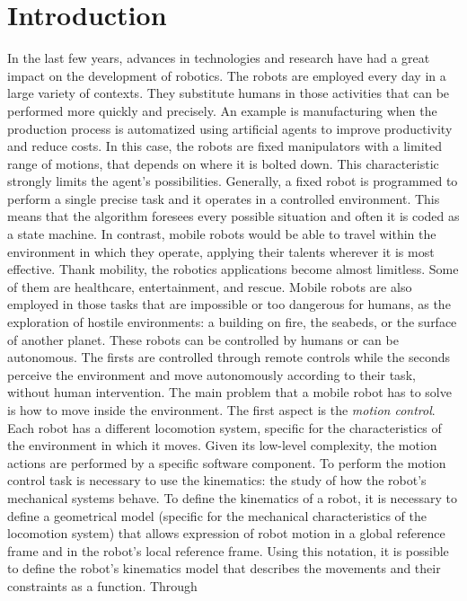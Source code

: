 \section{Introduction}\label{header-n3}

In the last few years, advances in technologies and research have had a
great impact on the development of robotics. The robots are employed
every day in a large variety of contexts. They substitute humans in
those activities that can be performed more quickly and precisely. An
example is manufacturing when the production process is automatized
using artificial agents to improve productivity and reduce costs. In
this case, the robots are fixed manipulators with a limited range of
motions, that depends on where it is bolted down. This characteristic
strongly limits the agent's possibilities. Generally, a fixed robot is
programmed to perform a single precise task and it operates in a
controlled environment. This means that the algorithm foresees every
possible situation and often it is coded as a state machine. In
contrast, mobile robots would be able to travel within the environment
in which they operate, applying their talents wherever it is most
effective. Thank mobility, the robotics applications become almost
limitless. Some of them are healthcare, entertainment, and rescue.
Mobile robots are also employed in those tasks that are impossible or
too dangerous for humans, as the exploration of hostile environments: a
building on fire, the seabeds, or the surface of another planet. These
robots can be controlled by humans or can be autonomous. The firsts are
controlled through remote controls while the seconds perceive the
environment and move autonomously according to their task, without human
intervention. The main problem that a mobile robot has to solve is how
to move inside the environment. The first aspect is the \emph{motion
	control}. Each robot has a different locomotion system, specific for the
characteristics of the environment in which it moves. Given its
low-level complexity, the motion actions are performed by a specific
software component. To perform the motion control task is necessary to
use the kinematics: the study of how the robot's mechanical systems
behave. To define the kinematics of a robot, it is necessary to define a
geometrical model (specific for the mechanical characteristics of the
locomotion system) that allows expression of robot motion in a global
reference frame and in the robot's local reference frame. Using this
notation, it is possible to define the robot's kinematics model that
describes the movements and their constraints as a function. Through
